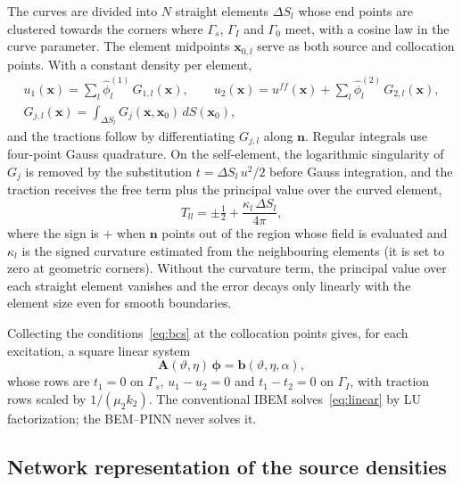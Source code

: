 \documentclass[11pt,twoside]{article}
\begin{document}
The curves are divided into $N$ straight elements $\Delta S_l$ whose end points are clustered towards the corners where $\Gamma_s$, $\Gamma_I$ and $\Gamma_0$ meet, with a cosine law in the curve parameter. The element midpoints $\mathbf{x}_{0,l}$ serve as both source and collocation points. With a constant density per element,
\begin{equation*}
  \begin{gathered}
  u_1(\mathbf{x}) = \sum_{l} \hat\phi^{(1)}_l\, G_{1,l}(\mathbf{x}),\qquad
  u_2(\mathbf{x}) = u^{f\!f}(\mathbf{x}) + \sum_{l} \hat\phi^{(2)}_l\, G_{2,l}(\mathbf{x}),\\
  G_{j,l}(\mathbf{x}) = \int_{\Delta S_l} G_j(\mathbf{x},\mathbf{x}_0)\, dS(\mathbf{x}_0),
  \end{gathered}
\end{equation*}
and the tractions follow by differentiating $G_{j,l}$ along $\mathbf{n}$. Regular integrals use four-point Gauss quadrature. On the self-element, the logarithmic singularity of $G_j$ is removed by the substitution $t=\Delta S_l\,u^2/2$ before Gauss integration, and the traction receives the free term plus the principal value over the curved element,
\begin{equation}\label{eq:selfterm}
  T_{ll} = \pm\tfrac12 + \frac{\kappa_l\,\Delta S_l}{4\pi},
\end{equation}
where the sign is $+$ when $\mathbf{n}$ points out of the region whose field is evaluated and $\kappa_l$ is the signed curvature estimated from the neighbouring elements (it is set to zero at geometric corners). Without the curvature term, the principal value over each straight element vanishes and the error decays only linearly with the element size even for smooth boundaries.

Collecting the conditions~\eqref{eq:bcs} at the collocation points gives, for each excitation, a square linear system
\begin{equation}\label{eq:linear}
  \mathbf{A}(\vartheta,\eta)\,\boldsymbol{\phi} = \mathbf{b}(\vartheta,\eta,\alpha),
\end{equation}
whose rows are $t_1=0$ on $\Gamma_s$, $u_1-u_2=0$ and $t_1-t_2=0$ on $\Gamma_I$, with traction rows scaled by $1/(\mu_2 k_2)$. The conventional IBEM solves~\eqref{eq:linear} by LU factorization; the BEM--PINN never solves it.

\subsection{Network representation of the source densities}
\end{document}
